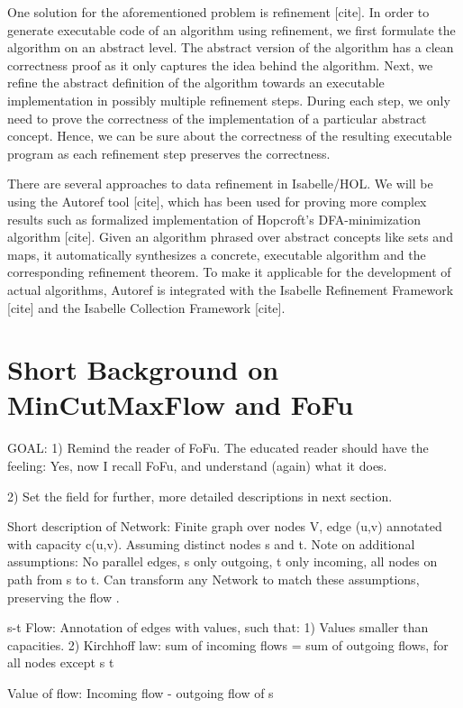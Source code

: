 \documentclass{llncs}
\begin{document}
One solution for the aforementioned problem is refinement [cite]. In order to generate executable code of an algorithm using refinement, we first formulate the algorithm on an abstract level. The abstract version of the algorithm has a clean correctness proof as it only captures the idea behind the algorithm. Next, we refine the abstract definition of the algorithm towards an executable implementation in possibly multiple refinement steps. During each step, we only need to prove the correctness of the implementation of a particular abstract concept. Hence, we can be sure about the correctness of the resulting executable program as each refinement step preserves the correctness.

There are several approaches to data refinement in Isabelle/HOL. We will be using the Autoref tool [cite], which has been used for proving more complex results such as formalized implementation of Hopcroft’s DFA-minimization algorithm [cite]. Given an algorithm phrased over abstract concepts like sets and maps, it automatically synthesizes a concrete, executable algorithm and the corresponding refinement theorem. To make it applicable for the development of actual algorithms, Autoref is integrated with the Isabelle Refinement Framework [cite] and the Isabelle Collection Framework [cite].


\section{Short Background on MinCutMaxFlow and FoFu}
  GOAL: 
    1) Remind the reader of FoFu. The educated reader should have the feeling:
      Yes, now I recall FoFu, and understand (again) what it does.
      
    2) Set the field for further, more detailed descriptions in next section.
  

  Short description of Network: Finite graph over nodes V, 
    edge (u,v) annotated with capacity c(u,v).
    Assuming distinct nodes s and t. 
    Note on additional assumptions: 
        No parallel edges, s only outgoing, t only incoming, all nodes on path from s to t. 
        Can transform any Network to match these assumptions, preserving the flow \cite{???}.
        
  s-t Flow: Annotation of edges with values, such that: 
    1) Values smaller than capacities.
    2) Kirchhoff law: sum of incoming flows = sum of outgoing flows, for all nodes except s t
  
  Value of flow: Incoming flow - outgoing flow of s
  
\end{document}
